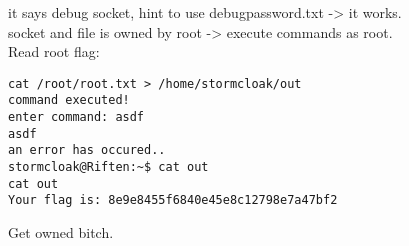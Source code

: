 \documentclass[titlepage]{article} %
\begin{document}
\newpage
it says debug socket, hint to use debugpassword.txt -> it works. \\ 
socket and file is owned by root -> execute commands as root. \\

Read root flag:

\begin{verbatim}
cat /root/root.txt > /home/stormcloak/out
command executed!
enter command: asdf
asdf
an error has occured..
stormcloak@Riften:~$ cat out
cat out
Your flag is: 8e9e8455f6840e45e8c12798e7a47bf2 
\end{verbatim}

Get owned bitch.
\end{document}
